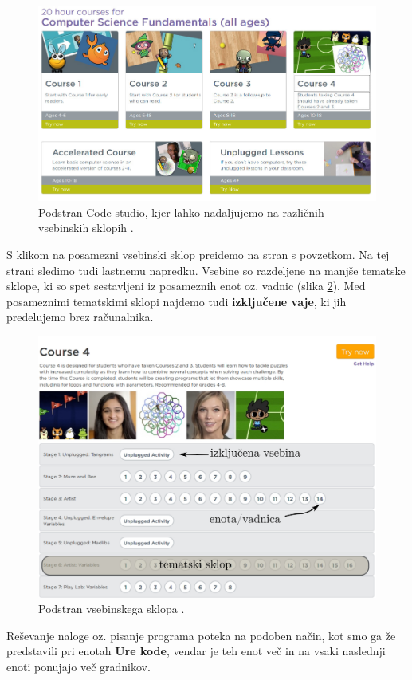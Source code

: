 \begin{figure}[h!]
  \centering
  \includegraphics [width=0.65\linewidth, keepaspectratio =
  1] {./images/sc_web/code_cs_main_v01.jpg}
  \caption{Podstran Code studio, kjer lahko nadaljujemo na
    različnih vsebinskih sklopih \cite{web:code.org:studio}.}
  \label{fig:scr:web:codestudio:main}
\end{figure}

S klikom na posamezni vsebinski sklop preidemo na stran s
povzetkom. Na tej strani sledimo tudi lastnemu napredku. Vsebine so
razdeljene na manjše tematske sklope, ki so spet sestavljeni iz
posameznih enot oz. vadnic (slika
\ref{fig:scr:web:codestudio:course}). Med posameznimi tematskimi
sklopi najdemo tudi \textbf{izključene vaje}, ki jih predelujemo brez
računalnika.

\begin{figure}[h!]
  \centering
  \includegraphics [width=0.65\linewidth, keepaspectratio =
  1] {./images/sc_web/code_course.jpg}
  \caption{Podstran vsebinskega sklopa \cite{web:code.org:studio}.}
  \label{fig:scr:web:codestudio:course}
\end{figure}
  
Reševanje naloge oz. pisanje programa poteka na podoben način, kot smo
ga že predstavili pri enotah \textbf{Ure kode}, vendar je teh enot več
in na vsaki naslednji enoti ponujajo več gradnikov.


